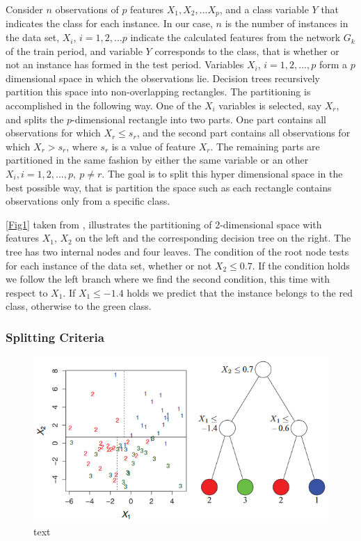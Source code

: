 \documentclass{acm_proc_article-sp}
\begin{document}
Consider $n$ observations of $p$ features $X_1, X_2,...X_p$, and a class variable $Y$ that indicates the class for each instance. In our case, $n$ is the number of instances in the data set, $X_i$, $i = 1,2,...p$ indicate the calculated features from the network $G_k$ of the train period, and variable $Y$ corresponds to the class, that is whether or not an instance has formed in the test period. Variables $X_i$, $i = 1,2,...,p$ form a $p$ dimensional space in which the observations lie. Decision trees recursively partition this space into non-overlapping rectangles. The partitioning is accomplished in the following way. One of the $X_i$ variables is selected, say $X_r$, and splits the $p$-dimensional rectangle into two parts. One part contains all observations for which $X_r \leqslant s_r$, and the second part contains all observations for which $X_r > s_r$, where $s_r$ is a value of feature $X_r$. The remaining parts are partitioned in the same fashion by either the same variable or an other $X_i, i = 1,2,..., p,\ p\neq r$. The goal is to split this hyper dimensional space in the best possible way, that is partition the space such as each rectangle contains observations only from a specific class. 

\autoref{Fig1} taken from \cite{WIDM:WIDM8}, illustrates the partitioning of 2-dimensional space with features $X_1$, $X_2$ on the left and the corresponding decision tree on the right. The tree has two internal nodes and four leaves. The condition of the root node tests for each instance of the data set, whether or not $X_2 \leqslant 0.7$. If the condition holds we follow the left branch where we find the second condition, this time with respect to $X_1$. If $X_1 \leqslant -1.4$ holds we predict that the instance belongs to the red class, otherwise to the green class.

\subsubsection{Splitting Criteria}


\begin{figure}
	\centering
	\includegraphics[scale=.52]{Partitioning}
	\caption{text}
	\label{Fig1}
\end{figure}	
\end{document}

